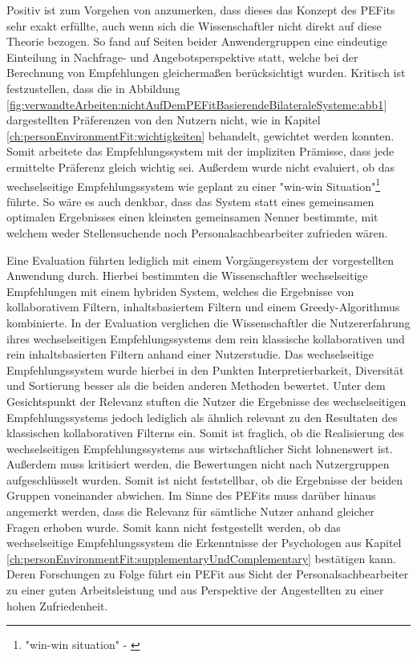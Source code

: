 Positiv ist zum Vorgehen von \textcite[S. 1ff.]{wenxing:2015} anzumerken, dass dieses das Konzept des \acp{PEFit} sehr exakt erfüllte, auch wenn sich die Wissenschaftler nicht direkt auf diese Theorie bezogen. So fand auf Seiten beider Anwendergruppen eine eindeutige Einteilung in Nachfrage- und Angebotsperspektive statt, welche bei der Berechnung von Empfehlungen gleichermaßen berücksichtigt wurden. Kritisch ist festzustellen, dass die in Abbildung \ref{fig:verwandteArbeiten:nichtAufDemPEFitBasierendeBilateraleSysteme:abb1} dargestellten Präferenzen von den Nutzern nicht, wie in Kapitel \ref{ch:personEnvironmentFit:wichtigkeiten} behandelt, gewichtet werden konnten. Somit arbeitete das Empfehlungssystem mit der impliziten Prämisse, dass jede ermittelte Präferenz gleich wichtig sei. Außerdem wurde nicht evaluiert, ob das wechselseitige Empfehlungssystem wie geplant zu einer "win-win Situation"\footnote{"win-win situation" - \textcite[S. 3, Z. 45f.]{wenxing:2015}} \cite[S. 3, Z. 45f.]{wenxing:2015} führte. So wäre es auch denkbar, dass das System statt eines gemeinsamen optimalen Ergebnisses einen kleinsten gemeinsamen Nenner bestimmte, mit welchem weder Stellensuchende noch Personalsachbearbeiter zufrieden wären.

Eine Evaluation führten \textcite[S. 1ff.]{hong:2013b} lediglich mit einem Vorgängersystem der vorgestellten Anwendung durch. Hierbei bestimmten die Wissenschaftler wechselseitige Empfehlungen mit einem hybriden System, welches die Ergebnisse von kollaborativem Filtern, inhaltsbasiertem Filtern und einem Greedy-Algorithmus kombinierte. In der Evaluation verglichen die Wissenschaftler die Nutzererfahrung ihres wechselseitigen Empfehlungssystems dem rein klassische kollaborativen und rein inhaltsbasierten Filtern anhand einer Nutzerstudie. Das wechselseitige Empfehlungssystem wurde hierbei in den Punkten Interpretierbarkeit, Diversität und Sortierung besser als die beiden anderen Methoden bewertet. Unter dem Gesichtspunkt der Relevanz stuften die Nutzer die Ergebnisse des wechselseitigen Empfehlungssystems jedoch lediglich als ähnlich relevant zu den Resultaten des klassischen kollaborativen Filterns ein. Somit ist fraglich, ob die Realisierung des wechselseitigen Empfehlungssystems aus wirtschaftlicher Sicht lohnenswert ist. Außerdem muss kritisiert werden, die Bewertungen nicht nach Nutzergruppen aufgeschlüsselt wurden. Somit ist nicht feststellbar, ob die Ergebnisse der beiden Gruppen voneinander abwichen. Im Sinne des \acp{PEFit} muss darüber hinaus angemerkt werden, dass die Relevanz für sämtliche Nutzer anhand gleicher Fragen erhoben wurde. Somit kann nicht festgestellt werden, ob das wechselseitige Empfehlungssystem die Erkenntnisse der Psychologen aus Kapitel \ref{ch:personEnvironmentFit:supplementaryUndComplementary} bestätigen kann. Deren Forschungen zu Folge führt ein \ac{PEFit} aus Sicht der Personalsachbearbeiter zu einer guten Arbeitsleistung und aus Perspektive der Angestellten zu einer hohen Zufriedenheit.


